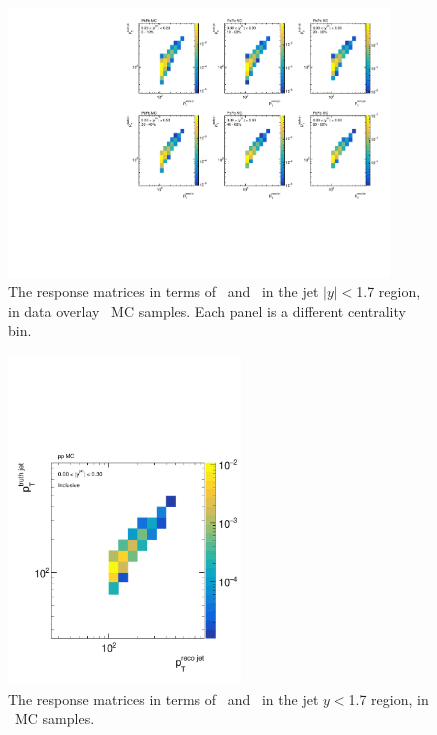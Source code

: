 \begin{figure}[ht]
\centering
\includegraphics[page=5, width=0.9\textwidth]{figures/main/corrections/resp_matrix_jet_PbPb_MC.pdf}
\caption{The response matrices in terms of \ptjetreco\ and \ptjettruth\ in the jet $|y| < $1.7 region, in data overlay \pbpb\ MC samples.
Each panel is a different centrality bin.}
\label{fig:PbPb_jetspect_respmatrix}
\end{figure}

\begin{figure}[ht]
\centering
\includegraphics[page=5, width=0.55\textwidth]{figures/main/corrections/resp_matrix_jet_pp_MC.pdf}
\caption{The response matrices in terms of \ptjetreco\ and \ptjettruth\ in the jet $y < $1.7 region, in \pp\ MC samples.}
\label{fig:pp_jetspect_respmatrix}
\end{figure}

